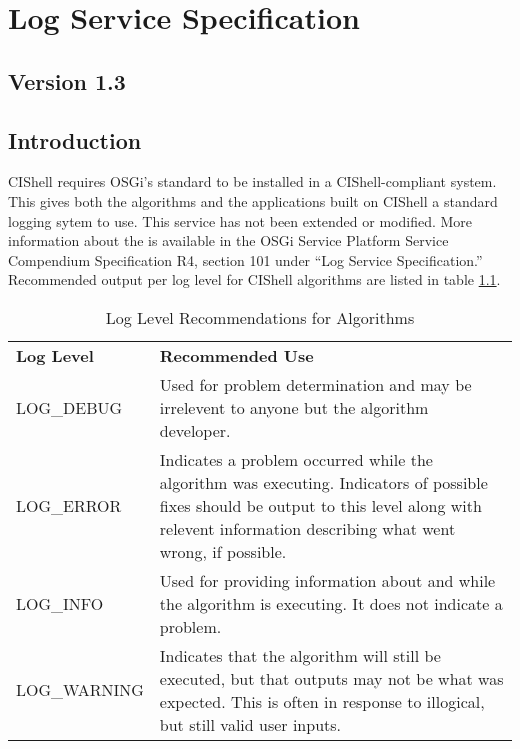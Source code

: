 %

\chapter{Log Service Specification}
\label{logService}
\section*{Version 1.3}
\section{Introduction}

CIShell requires OSGi's standard  to be installed in a
CIShell-compliant system. This gives both the algorithms and the applications
built on CIShell a standard logging sytem to use. This service has not been
extended or modified. More information about the  is available
in the OSGi Service Platform Service Compendium Specification R4, section 101
under ``Log Service Specification.'' Recommended output per log level for
CIShell algorithms are listed in table \ref{table:logLevels}.

\begin{table}[htb!]
\begin{center}
\begin{tabular}{l p{12cm}}
\textbf{Log Level} & \textbf{Recommended Use} \\
LOG\_DEBUG & Used for problem determination and may be irrelevent to anyone but
the algorithm developer. \\
LOG\_ERROR & Indicates a problem occurred while the algorithm was executing.
Indicators of possible fixes should be output to this level along with
relevent information describing what went wrong, if possible. \\
LOG\_INFO & Used for providing information about and while the algorithm is
executing. It does not indicate a problem. \\
LOG\_WARNING & Indicates that the algorithm will still be executed, but
that outputs may not be what was expected. This is often in response to
illogical, but still valid user inputs.
\end{tabular}
\end{center}
\caption{Log Level Recommendations for Algorithms}
\label{table:logLevels}
\end{table}
